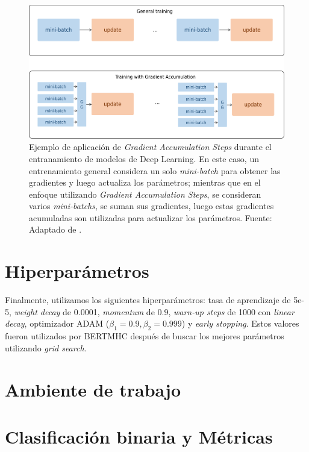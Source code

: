 \begin{figure}[H]
	\centering
	\includegraphics[width=\textwidth]{../img/proposal/gas_own}	
	\caption[Ejemplo de aplicación de \textit{Gradient Accumulation Steps}]{Ejemplo de aplicación de \textit{Gradient Accumulation Steps} durante el entranamiento de modelos de Deep Learning. En este caso, un entrenamiento general considera un solo \textit{mini-batch} para obtener las gradientes y luego actualiza los parámetros; mientras que en el enfoque utilizando \textit{Gradient Accumulation Steps}, se consideran varios \textit{mini-batchs}, se suman sus gradientes, luego estas gradientes acumuladas son utilizadas para actualizar los parámetros.  Fuente: Adaptado de  \cite{prince2023understanding}.}		
	\label{fig:gas_example}
\end{figure}



\section{Hiperparámetros}\label{sec:hyperparam}
Finalmente, utilizamos los siguientes hiperparámetros: tasa de aprendizaje de 5e-5, \textit{weight decay} de 0.0001, \textit{momentum} de 0.9, \textit{warn-up steps} de 1000 con \textit{linear decay}, optimizador ADAM ($\beta_1 = 0.9, \beta_2=0.999$) y \textit{early stopping}. Estos valores fueron utilizados por BERTMHC \citep{cheng2021bertmhc} después de buscar los mejores parámetros utilizando \textit{grid search}.

\section{Ambiente de trabajo}

\section{Clasificación binaria y Métricas}

